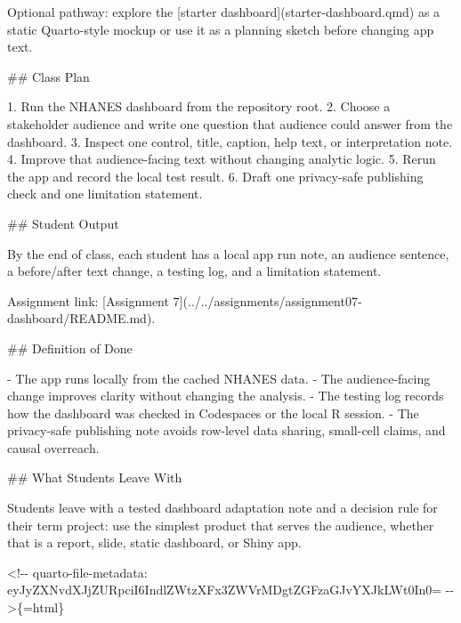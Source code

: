 \documentclass[
  letterpaper,
  DIV=11,
  numbers=noendperiod,
  oneside]{scrreprt}
\newenvironment{Shaded}{\begin{snugshade}}{\end{snugshade}}
\newcommand{\CommentTok}[1]{\textcolor[rgb]{0.37,0.37,0.37}{#1}}
\newcommand{\FunctionTok}[1]{\textcolor[rgb]{0.28,0.35,0.67}{#1}}
\newcommand{\InformationTok}[1]{\textcolor[rgb]{0.37,0.37,0.37}{#1}}
\newcommand{\NormalTok}[1]{\textcolor[rgb]{0.00,0.23,0.31}{#1}}
\newcommand{\OtherTok}[1]{\textcolor[rgb]{0.00,0.23,0.31}{#1}}
\newcommand{\SpecialStringTok}[1]{\textcolor[rgb]{0.13,0.47,0.30}{#1}}
\begin{document}
\begin{Shaded}
\begin{Highlighting}[numbers=left,,]
\NormalTok{Optional pathway: explore the }\CommentTok{[}\OtherTok{starter dashboard}\CommentTok{](starter{-}dashboard.qmd)}\NormalTok{ as a static Quarto{-}style mockup or use it as a planning sketch before changing app text.}

\FunctionTok{\#\# Class Plan}

\SpecialStringTok{1. }\NormalTok{Run the NHANES dashboard from the repository root.}
\SpecialStringTok{2. }\NormalTok{Choose a stakeholder audience and write one question that audience could answer from the dashboard.}
\SpecialStringTok{3. }\NormalTok{Inspect one control, title, caption, help text, or interpretation note.}
\SpecialStringTok{4. }\NormalTok{Improve that audience{-}facing text without changing analytic logic.}
\SpecialStringTok{5. }\NormalTok{Rerun the app and record the local test result.}
\SpecialStringTok{6. }\NormalTok{Draft one privacy{-}safe publishing check and one limitation statement.}

\FunctionTok{\#\# Student Output}

\NormalTok{By the end of class, each student has a local app run note, an audience sentence, a before/after text change, a testing log, and a limitation statement.}

\NormalTok{Assignment link: }\CommentTok{[}\OtherTok{Assignment 7}\CommentTok{](../../assignments/assignment07{-}dashboard/README.md)}\NormalTok{.}

\FunctionTok{\#\# Definition of Done}

\SpecialStringTok{{-} }\NormalTok{The app runs locally from the cached NHANES data.}
\SpecialStringTok{{-} }\NormalTok{The audience{-}facing change improves clarity without changing the analysis.}
\SpecialStringTok{{-} }\NormalTok{The testing log records how the dashboard was checked in Codespaces or the local R session.}
\SpecialStringTok{{-} }\NormalTok{The privacy{-}safe publishing note avoids row{-}level data sharing, small{-}cell claims, and causal overreach.}

\FunctionTok{\#\# What Students Leave With}

\NormalTok{Students leave with a tested dashboard adaptation note and a decision rule for their term project: use the simplest product that serves the audience, whether that is a report, slide, static dashboard, or Shiny app.}


\InformationTok{\textasciigrave{}\textless{}!{-}{-} quarto{-}file{-}metadata: eyJyZXNvdXJjZURpciI6IndlZWtzXFx3ZWVrMDgtZGFzaGJvYXJkLWt0In0= {-}{-}\textgreater{}\textasciigrave{}}\NormalTok{\{=html\}}


\end{Highlighting}
\end{Shaded}
\end{document}
